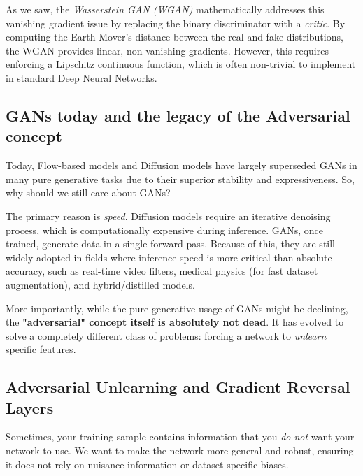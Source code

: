 As we saw, the \textit{Wasserstein GAN (WGAN)} mathematically addresses this vanishing gradient issue by replacing the binary discriminator with a \textit{critic}. By computing the Earth Mover's distance between the real and fake distributions, the WGAN provides linear, non-vanishing gradients. However, this requires enforcing a Lipschitz continuous function, which is often non-trivial to implement in standard Deep Neural Networks.

\subsection{GANs today and the legacy of the Adversarial concept}

Today, Flow-based models and Diffusion models have largely superseded GANs in many pure generative tasks due to their superior stability and expressiveness. So, why should we still care about GANs?

The primary reason is \textit{speed}. Diffusion models require an iterative denoising process, which is computationally expensive during inference. GANs, once trained, generate data in a single forward pass. Because of this, they are still widely adopted in fields where inference speed is more critical than absolute accuracy, such as real-time video filters, medical physics (for fast dataset augmentation), and hybrid/distilled models.

More importantly, while the pure generative usage of GANs might be declining, the \textbf{"adversarial" concept itself is absolutely not dead}. It has evolved to solve a completely different class of problems: forcing a network to \textit{unlearn} specific features.

\subsection{Adversarial Unlearning and Gradient Reversal Layers}

Sometimes, your training sample contains information that you \textit{do not} want your network to use. We want to make the network more general and robust, ensuring it does not rely on nuisance information or dataset-specific biases. 

